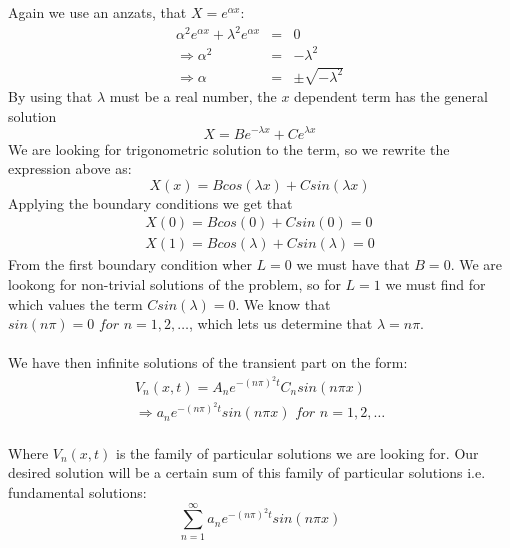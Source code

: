 \documentclass{article}
\begin{document}
Again we use an anzats, that $X=e^{\alpha x}$:
\begin{subequations}
\begin{eqnarray}
\alpha^2 e^{\alpha x} + \lambda^2 e^{\alpha x} &=& 0 \\ 
\Rightarrow \alpha^2 &=& -\lambda^2 \\ 
\Rightarrow \alpha &=& \pm \sqrt{-\lambda^2}
\end{eqnarray}
\end{subequations}
By using that $\lambda$ must be a real number, the $x$ dependent term has the general solution 
\begin{equation}
X = Be^{-\lambda x} + Ce^{\lambda x}
\label{eqn:xDependenttransientTerm1D}
\end{equation}
We are looking for trigonometric solution to the term, so we rewrite the expression above as:
\begin{equation}
X(x) = Bcos(\lambda x) + Csin(\lambda x) 
\end{equation}
Applying the boundary conditions we get that
\begin{eqnarray}
X(0) = Bcos(0) + Csin(0) = 0 \\ 
X(1) = Bcos(\lambda) + Csin(\lambda) = 0
\end{eqnarray}
From the first boundary condition wher $L=0$ we must have that $B=0$. We are lookong for non-trivial solutions of the problem, so for $L=1$ we must find for which values the term $Csin(\lambda)=0$. We know that\\ $sin(n \pi) =0 \textit{ for } n = 1,2, \ldots $, which lets us determine that $\lambda = n \pi$.
\\
\\
We have then infinite solutions of the transient part on the form:
\begin{subequations}
\begin{eqnarray}
V_n(x,t) = A_ne^{-(n\pi)^2 t}C_nsin(n \pi x)\\
\Rightarrow a_ne^{-(n\pi)^2 t}sin(n \pi x) \textit{ for } n = 1,2, \ldots 
\end{eqnarray}
\end{subequations}
\\
Where ${V_n(x,t)}$ is the family of particular solutions we are looking for. Our desired solution will be a certain sum of this family of particular solutions i.e. fundamental solutions:
\begin{equation}
\sum_{n=1}^{\infty} a_ne^{-(n\pi)^2 t}sin(n \pi x)
\label{eqn:FundamentalSolutionODE}
\end{equation}
\end{document}
